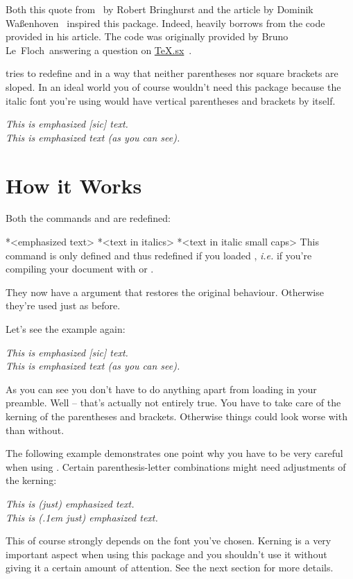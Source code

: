 \documentclass[DIV10,toc=index,toc=bib]{cnpkgdoc}
\begin{document}
\noindent
Both this quote from~ by Robert Bringhurst and the
article  by Dominik Waßenhoven~\cite{dtk12-dw} inspired
this package.  Indeed, \embrac heavily borrows from the code
\citeauthor{dtk12-dw} provided in his article\manythanks. The code was
originally provided by Bruno Le~Floch\manythanks\ answering a question on
\href{http://tex.stackexchange.com}{TeX.sx}~\cite{lefloch11}.

\embrac tries to redefine  and  in a way that neither
parentheses nor square brackets are sloped.  In an ideal world you of course
wouldn't need this package because the italic font you're using would have
vertical parentheses and brackets by itself.

\begin{beispiel}
 \emph{This is emphasized [sic] text.} \\
 \emph{This is emphasized text (as you can see).}
\end{beispiel}

\section{How it Works}
Both the commands  and  are redefined:
\begin{beschreibung}
 *{<emphasized text>}
 *{<text in italics>}
 *{<text in italic small caps>}\newline
   This command is only defined and thus redefined if you loaded ,
   \emph{i.e.} if you're compiling your document with \XeLaTeX{} or \LuaLaTeX.
\end{beschreibung}
They now have a \code{*} argument that restores the original behaviour.
Otherwise they're used just as before.

Let's see the example again:
\begin{beispiel}
 \emph{This is emphasized [sic] text.} \\
 \emph{This is emphasized text (as you can see).}
\end{beispiel}
As you can see you don't have to do anything apart from loading \embrac in
your preamble.  Well -- that's actually not entirely true.  You have to take
care of the kerning of the parentheses and brackets.  Otherwise things could
look worse with \embrac than without.

The following example demonstrates one point why you have to be very careful
when using \embrac.  Certain parenthesis-letter combinations might need
adjustments of the kerning:
\begin{beispiel}
 \emph{This is (just) emphasized text.} \\
 \emph{This is (\kern.1em just) emphasized text.}
\end{beispiel}
This of course strongly depends on the font you've chosen.  Kerning is a very
important aspect when using this package and you shouldn't use it without
giving it a certain amount of attention.  See the next section for more
details.  
\end{document}
